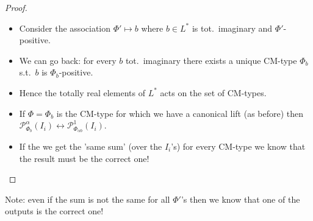 \documentclass[usenames,dvipsnames,handout]{beamer}
\newcommand{\Palpha}[2]{\mathcal{P}^{\alpha}_{{#1}}({#2})}
\newcommand{\Pone}[2]{\mathcal{P}^{1}_{{#1}}({#2})}
\begin{document}
\begin{frame}{ }
    \begin{proof}
        \begin{itemize}
        \item Consider the association $\Phi'\mapsto b$ where $b\in L^*$ is tot.~imaginary and $\Phi'$-positive.
        \pause \item We can go back: for every $b$ tot.~imaginary there exists a unique CM-type $\Phi_b$ s.t.~$b$ is $\Phi_b$-positive.
        \pause \item Hence the totally real elements of $L^*$ acts on the set of CM-types.
        \pause \item If $\Phi=\Phi_{b}$ is the CM-type for which we have a canonical lift (as before)
        then $\Palpha{\Phi_b}{I_i} \longleftrightarrow \Pone{\Phi_{\alpha b}}{I_i}$.
        \pause \item If the we get the 'same sum' (over the $I_i$'s) for every CM-type we know that the result must be the correct one! 
        \end{itemize}
    \end{proof}
    \pause Note: even if the sum is not the same for all $\Phi'$'s then we know that one of the outputs is the correct one!
\end{frame}
\end{document}
